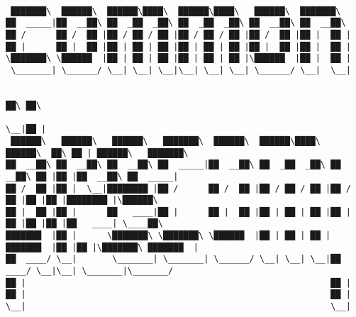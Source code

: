 \documentclass[varwidth=\maxdimen,margin=0.5cm,multi={verbatim}]{standalone}
\begin{document}
\begin{verbatim}

 ███████\  ██████\  ██████\████\  ██████\████\   ██████\  ███████\
██  _____|██  __██\ ██  _██  _██\ ██  _██  _██\ ██  __██\ ██  __██\
██ /      ██ /  ██ |██ / ██ / ██ |██ / ██ / ██ |██ /  ██ |██ |  ██ |
██ |      ██ |  ██ |██ | ██ | ██ |██ | ██ | ██ |██ |  ██ |██ |  ██ |
\███████\ \██████  |██ | ██ | ██ |██ | ██ | ██ |\██████  |██ |  ██ |
 \_______| \______/ \__| \__| \__|\__| \__| \__| \______/ \__|  \__|

                                                                          ██\ ██\
                                                                          \__|██ |
 ██████\   ██████\   ██████\   ███████\  ██████\  ██████\████\   ██████\  ██\ ██ | ██████\   ███████\
██  __██\ ██  __██\ ██  __██\ ██  _____|██  __██\ ██  _██  _██\ ██  __██\ ██ |██ |██  __██\ ██  _____|
██ /  ██ |██ |  \__|████████ |██ /      ██ /  ██ |██ / ██ / ██ |██ /  ██ |██ |██ |████████ |\██████\
██ |  ██ |██ |      ██   ____|██ |      ██ |  ██ |██ | ██ | ██ |██ |  ██ |██ |██ |██   ____| \____██\
███████  |██ |      \███████\ \███████\ \██████  |██ | ██ | ██ |███████  |██ |██ |\███████\ ███████  |
██  ____/ \__|       \_______| \_______| \______/ \__| \__| \__|██  ____/ \__|\__| \_______|\_______/
██ |                                                            ██ |
██ |                                                            ██ |
\__|                                                            \__|


\end{verbatim}
\end{document}
